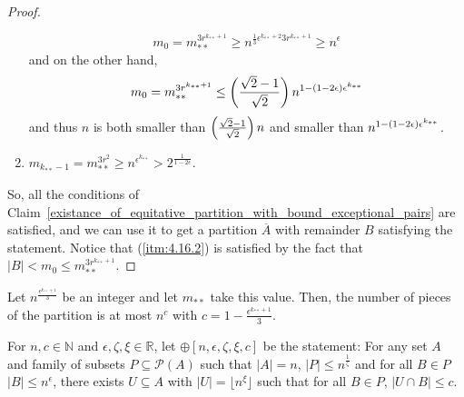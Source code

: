\begin{theorem}[Theorem 4.16]
\begin{proof}
\begin{enumerate}
                    \[
                        m_0 = m_{**}^{3r^{k_{**}+1}} \geq n^{\frac{1}{3}\epsilon^{k_{**}+2} 3r^{k_{**}+1}}
                            \geq n^{\epsilon}
                    \]
                    and on the other hand,
                    \[
                        m_0 = m_{**}^{3r^{k_{**}+1}} \leq \left( \frac{\sqrt{2}-1}{\sqrt{2}} \right) n^{1 - \left( 1 - 2\epsilon \right) \epsilon^{k_{**}}}
                    \]
                    and thus $n$ is both smaller than $\left( \frac{\sqrt{2}-1}{\sqrt{2}} \right) n$ and
                    smaller than $n^{1 - \left( 1 - 2\epsilon \right) \epsilon^{k_{**}}}$.
                \item $m_{k_{**}-1} = m_{**}^{3r^2} \geq n^{\epsilon^{k_{**}}} > 2^{\frac{1}{1-2\epsilon}}$.
            \end{enumerate}
            So, all the conditions of Claim~\ref{existance_of_equitative_partition_with_bound_exceptional_pairs} are satisfied,
            and we can use it to get a partition $\overline{A}$ with remainder $B$ satisfying the statement.
            Notice that (\ref{itm:4.16.2}) is satisfied by the fact that $|B| < m_0 \leq m_{**}^{3r^{k_{**}+1}}$.
        \end{proof}
    \end{theorem}


    \begin{remark}
        Let $n^{\frac{\epsilon^{k_{**}+1}}{3}}$ be an integer and let $m_{**}$ take this value.
        Then, the number of pieces of the partition is at most $n^c$ with $c = 1 - \frac{\epsilon^{k_{**}+1}}{3}$.
    \end{remark}


    \begin{definition}[Definition 4.18] \label{n_large_enough_property}
        For $n, c \in \mathbb{N}$ and $\epsilon, \zeta, \xi \in \mathbb{R}$, let $\oplus[n, \epsilon, \zeta, \xi, c]$ be
        the statement:
        For any set $A$ and family of subsets $P \subseteq \mathcal{P}(A)$ such that $|A| = n$, $|P| \leq n^{\frac{1}{\zeta}}$ and for all
        $B \in P$ $|B| \leq n^\epsilon$, there exists $U \subseteq A$ with $|U| = \lfloor n^\xi \rfloor$ such that
        for all $B \in P$, $|U \cap B| \leq c$.
    \end{definition}


